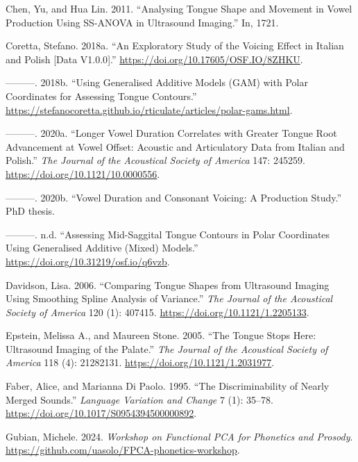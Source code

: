 \documentclass[
]{interact}
\newlength{\cslhangindent}
\newenvironment{CSLReferences}[2] %
 {\begin{list}{}{%
  \setlength{\itemindent}{0pt}
  \setlength{\leftmargin}{0pt}
  \setlength{\parsep}{0pt}
  \ifodd #1
   \setlength{\leftmargin}{\cslhangindent}
   \setlength{\itemindent}{-1\cslhangindent}
  \fi
  \setlength{\itemsep}{#2\baselineskip}}}
 {\end{list}}
\begin{document}
\label{refs}
\begin{CSLReferences}{1}{0}
Chen, Yu, and Hua Lin. 2011. {``Analysing Tongue Shape and Movement in
Vowel Production Using SS-ANOVA in Ultrasound Imaging.''} In, 1721.

Coretta, Stefano. 2018a. {``An Exploratory Study of the Voicing Effect
in Italian and Polish {[}Data V1.0.0{]}.''}
\url{https://doi.org/10.17605/OSF.IO/8ZHKU}.

---------. 2018b. {``Using Generalised Additive Models (GAM) with Polar
Coordinates for Assessing Tongue Contours.''}
\url{https://stefanocoretta.github.io/rticulate/articles/polar-gams.html}.

---------. 2020a. {``Longer Vowel Duration Correlates with Greater
Tongue Root Advancement at Vowel Offset: Acoustic and Articulatory Data
from Italian and Polish.''} \emph{The Journal of the Acoustical Society
of America} 147: 245259. \url{https://doi.org/10.1121/10.0000556}.

---------. 2020b. {``Vowel Duration and Consonant Voicing: A Production
Study.''} PhD thesis.

---------. n.d. {``Assessing Mid-Saggital Tongue Contours in Polar
Coordinates Using Generalised Additive (Mixed) Models.''}
\url{https://doi.org/10.31219/osf.io/q6vzb}.

Davidson, Lisa. 2006. {``Comparing Tongue Shapes from Ultrasound Imaging
Using Smoothing Spline Analysis of Variance.''} \emph{The Journal of the
Acoustical Society of America} 120 (1): 407415.
\url{https://doi.org/10.1121/1.2205133}.

Epstein, Melissa A., and Maureen Stone. 2005. {``The Tongue Stops Here:
Ultrasound Imaging of the Palate.''} \emph{The Journal of the Acoustical
Society of America} 118 (4): 21282131.
\url{https://doi.org/10.1121/1.2031977}.

Faber, Alice, and Marianna Di Paolo. 1995. {``The Discriminability of
Nearly Merged Sounds.''} \emph{Language Variation and Change} 7 (1):
35--78. \url{https://doi.org/10.1017/S0954394500000892}.

Gubian, Michele. 2024. \emph{Workshop on Functional PCA for Phonetics
and Prosody}. \url{https://github.com/uasolo/FPCA-phonetics-workshop}.


\end{CSLReferences}
\end{document}
